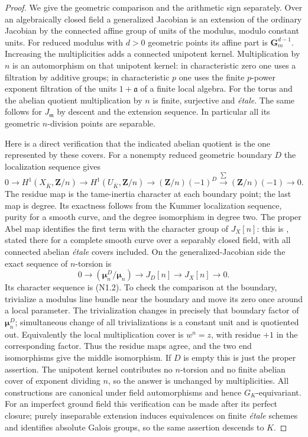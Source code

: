 \begin{proof}
We give the geometric comparison and the arithmetic sign separately.
Over an algebraically closed field a generalized Jacobian is an
extension of the ordinary Jacobian by the connected affine group
of units of the modulus, modulo constant units. For reduced modulus
with $d>0$ geometric points its affine part is $\mathbf G_m^{d-1}$.
Increasing the multiplicities adds a connected unipotent kernel.
Multiplication by $n$ is an automorphism on that unipotent kernel:
in characteristic zero one uses a filtration by additive groups;
in characteristic $p$ one uses the finite $p$-power exponent
filtration of the units $1+\mathfrak a$ of a finite local algebra.
For the torus and the abelian quotient multiplication by $n$ is
finite, surjective and \emph{\'etale}. The same follows for
$J_{\mathfrak m}$ by descent and the extension sequence. In
particular all its geometric $n$-division points are separable.

Here is a direct verification that the indicated abelian quotient
is the one represented by these covers. For a nonempty reduced
geometric boundary $D$ the localization sequence gives
\[
 0\to H^1(X_{\overline K},\mathbf Z/n)\to
 H^1(U_{\overline K},\mathbf Z/n)\to
 (\mathbf Z/n)(-1)^D\xrightarrow{\sum}
 (\mathbf Z/n)(-1)\to0.                                \tag{N1.2}
\]
The residue map is the tame-inertia character at each boundary point;
the last map is degree. Its exactness follows from the Kummer
localization sequence, purity for a smooth curve, and the degree
isomorphism in degree two. The proper Abel map identifies the first
term with the character group of $J_X[n]$: this is
\citet[Proposition 9.1]{MilneJac}, stated there for a complete smooth
curve over a separably closed field, with all connected abelian
\emph{\'etale} covers included. On the generalized-Jacobian side the
exact sequence of $n$-torsion is
\[
 0\to (\boldsymbol\mu_n^D/\boldsymbol\mu_n)
 \to J_D[n]\to J_X[n]\to0.
\]
Its character sequence is (N1.2). To check the comparison at the
boundary, trivialize a modulus line bundle near the boundary and
move its zero once around a local parameter. The trivialization
changes in precisely that boundary factor of $\boldsymbol\mu_n^D$;
simultaneous change of all trivializations is a constant unit and
is quotiented out. Equivalently the local multiplication cover is
$w^n=z$, with residue $+1$ in the corresponding factor. Thus the
residue maps agree, and the two end isomorphisms give the middle
isomorphism. If $D$ is empty this is just the proper assertion.
The unipotent kernel contributes no $n$-torsion and no finite
abelian cover of exponent dividing $n$, so the answer is unchanged
by multiplicities. All constructions are canonical under field
automorphisms and hence $G_K$-equivariant. For an imperfect ground
field this verification can be made after its perfect closure;
purely inseparable extension induces equivalences on finite
\emph{\'etale} schemes and identifies absolute Galois groups, so
the same assertion descends to $K$.


\end{proof}
